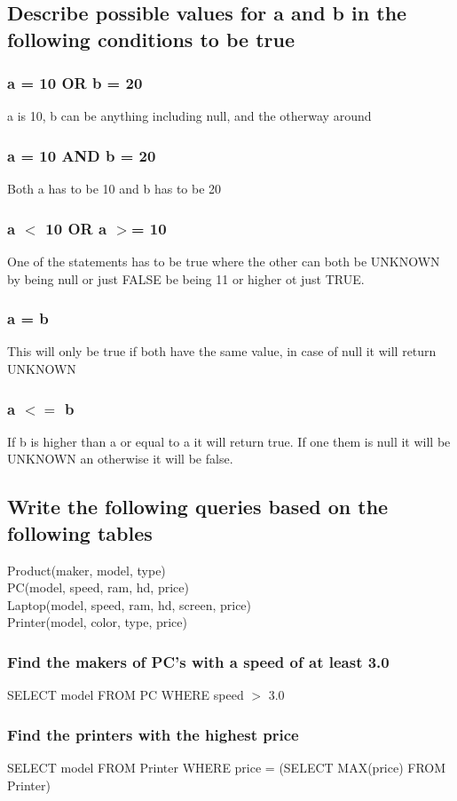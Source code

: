 \documentclass[12pt, a4paper]{article}
\begin{document}
		\subsection{Describe possible values for a and b in the following conditions to be true}
			\subsubsection{a = 10 OR b = 20}
				a is 10, b can be anything including null, and the otherway around
			\subsubsection{a = 10 AND b = 20}
				Both a has to be 10 and b has to be 20
			\subsubsection{a $<$ 10 OR a $>$= 10}
				One of the statements has to be true where the other can both be UNKNOWN by being null or just FALSE be being 11 or higher ot just TRUE.
			\subsubsection{a = b}
				This will only be true if both have the same value, in case of null it will return UNKNOWN
			\subsubsection{a $<=$ b}
				If b is higher than a or equal to a it will return true. If one them is null it will be UNKNOWN an otherwise it will be false.
		\subsection{Write the following queries based on the following tables}
			Product(maker, model, type)\\
			PC(model, speed, ram, hd, price)\\
			Laptop(model, speed, ram, hd, screen, price)\\
			Printer(model, color, type, price)\\
			\subsubsection{Find the makers of PC's with a speed of at least 3.0}
				SELECT model FROM PC WHERE speed $>$ 3.0
			\subsubsection{Find the printers with the highest price}
				SELECT model FROM Printer WHERE price = (SELECT MAX(price) FROM Printer)
\end{document}
